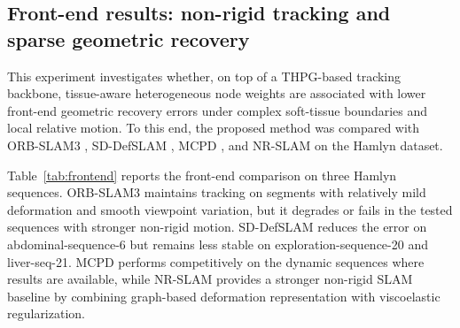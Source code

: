 \documentclass[pdflatex,sn-mathphys-num]{sn-jnl}
\begin{document}
\subsection{Front-end results: non-rigid tracking and sparse geometric recovery}\label{subsec:frontend-results}

This experiment investigates whether, on top of a THPG-based tracking backbone, tissue-aware heterogeneous node weights are associated with lower front-end geometric recovery errors under complex soft-tissue boundaries and local relative motion. To this end, the proposed method was compared with ORB-SLAM3 \cite{bib4}, SD-DefSLAM \cite{bib6}, MCPD \cite{bib8}, and NR-SLAM \cite{bib9} on the Hamlyn dataset.

\begin{table}[t]
\caption{Comparison of front-end non-rigid tracking performance on the Hamlyn dataset.}
\label{tab:frontend}
\centering
\small
{}
\end{table}

Table~\ref{tab:frontend} reports the front-end comparison on three Hamlyn sequences. ORB-SLAM3 maintains tracking on segments with relatively mild deformation and smooth viewpoint variation, but it degrades or fails in the tested sequences with stronger non-rigid motion. SD-DefSLAM reduces the error on abdominal-sequence-6 but remains less stable on exploration-sequence-20 and liver-seq-21. MCPD performs competitively on the dynamic sequences where results are available, while NR-SLAM provides a stronger non-rigid SLAM baseline by combining graph-based deformation representation with viscoelastic regularization.
\end{document}
